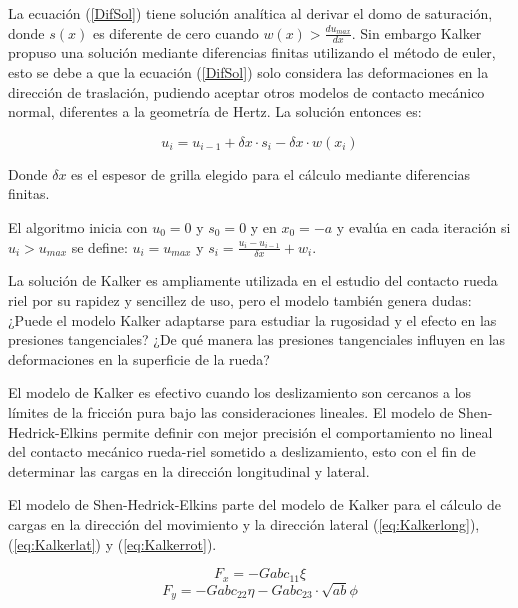 \documentclass[main]{subfiles}
\begin{document}
La ecuación (\ref{DifSol}) tiene solución analítica al derivar el domo de saturación, donde $s(x)$ es diferente de cero cuando $w(x)>\frac{du_{max}}{dx}$. Sin embargo Kalker propuso una solución mediante diferencias finitas utilizando el método de euler, esto se debe a que la ecuación (\ref{DifSol}) solo considera las deformaciones en la dirección de traslación, pudiendo aceptar otros modelos de contacto mecánico normal, diferentes a la geometría de Hertz. La solución entonces es:

\begin{equation}
\label{EulerSol}
u_i=u_{i-1}+\delta x\cdot s_i-\delta x\cdot w(x_i)
\end{equation}

\par \hspace{2cm}
\begin{minipage}{8cm}
\begin{spacing}{0.5}
Donde $\delta x$ es el espesor de grilla elegido para el cálculo mediante diferencias finitas. 
\end{spacing}
\end{minipage}

El algoritmo inicia con $u_0=0$ y $s_0=0$ y en $x_0=-a$ y evalúa en cada iteración si $u_i>u_{max}$ se define: $u_i=u_{max}$ y $s_i=\frac{u_i-u_{i-1}}{\delta x}+w_i$.

La solución de Kalker es ampliamente utilizada en el estudio del contacto rueda riel por su rapidez y sencillez de uso, pero el modelo también genera dudas: ¿Puede el modelo Kalker adaptarse para estudiar la rugosidad y el efecto en las presiones tangenciales? ¿De qué manera las presiones tangenciales influyen en las deformaciones en la superficie de la rueda?

El modelo de Kalker es efectivo cuando los deslizamiento son cercanos a los límites de la fricción pura bajo las consideraciones lineales. El modelo de Shen-Hedrick-Elkins permite definir con mejor precisión el comportamiento no lineal del contacto mecánico rueda-riel sometido a deslizamiento, esto con el fin de determinar las cargas en la dirección longitudinal y lateral.

El modelo de Shen-Hedrick-Elkins parte del modelo de Kalker para el cálculo de cargas en la dirección del movimiento y la dirección lateral (\ref{eq:Kalkerlong}), (\ref{eq:Kalkerlat}) y (\ref{eq:Kalkerrot}).

\begin{displaymath}
F_x=-Gabc_{11}\xi
\end{displaymath}
\begin{displaymath}
F_y=-Gabc_{22}\eta - Gabc_{23} \cdot \sqrt{ab} \phi
\end{displaymath}
\end{document}
